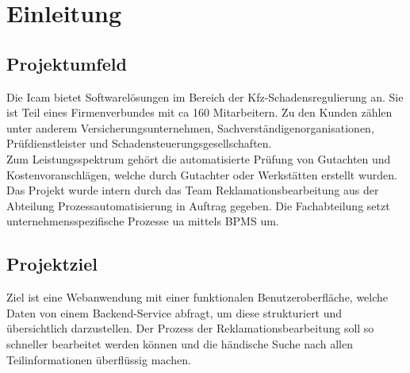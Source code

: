 \section{Einleitung}
\label{sec:Einleitung}


\subsection{Projektumfeld} 
\label{sec:Projektumfeld}
Die \ac{Icam} bietet Softwarelösungen im Bereich der Kfz-Schadensregulierung an.
Sie ist Teil eines Firmenverbundes mit \acs{ca} 160 Mitarbeitern. Zu den Kunden zählen unter
anderem Versicherungsunternehmen, Sachverständigenorganisationen, Prüfdienstleister und
Schadensteuerungsgesellschaften.\\
Zum Leistungsspektrum gehört die automatisierte Prüfung von Gutachten und
Kostenvoranschlägen, welche durch Gutachter oder Werkstätten erstellt wurden.\\
Das Projekt wurde intern durch das Team Reklamationsbearbeitung aus der Abteilung Prozessautomatisierung
in Auftrag gegeben. Die Fachabteilung setzt unternehmensspezifische Prozesse \acs{ua} mittels
\ac{BPMS} um.	


\subsection{Projektziel} 
\label{sec:Projektziel}
Ziel ist eine Webanwendung mit einer funktionalen Benutzeroberfläche, welche Daten von
einem Backend-Service abfragt, um diese strukturiert und übersichtlich darzustellen.
Der Prozess der Reklamationsbearbeitung soll so schneller bearbeitet werden können und die händische Suche nach
allen Teilinformationen überflüssig machen.

